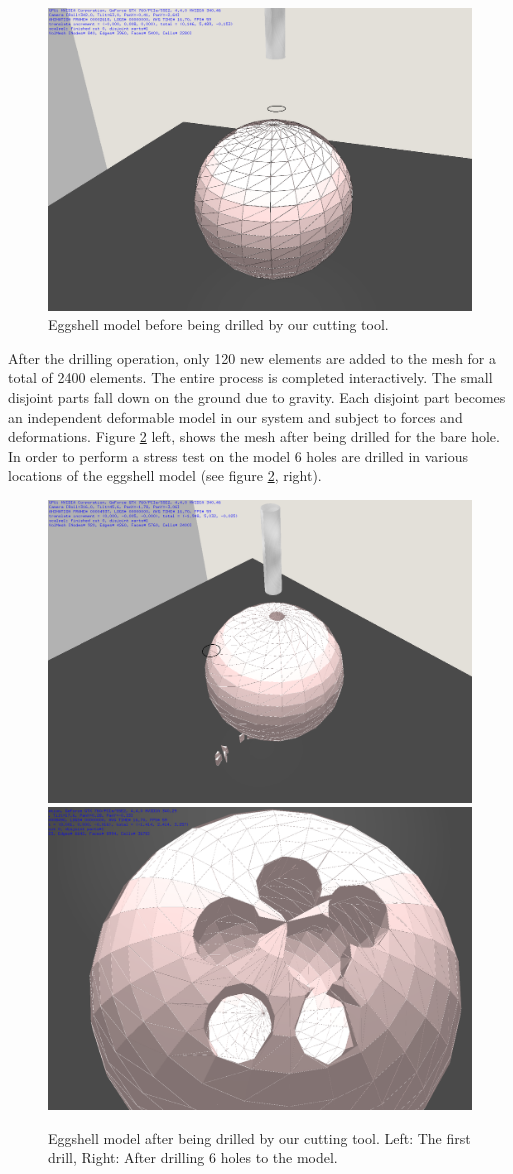 \begin{figure}[H]
  \centering
  \includegraphics[width=0.7\linewidth]{figures/evaluation/eggshell01.png}
  \caption{\label{fig:eggshell01}
  {Eggshell model before being drilled by our cutting tool.}
}
\end{figure}

After the drilling operation, only 120 new elements are added to the mesh for a total of 2400 elements. The entire process is completed 
interactively. The small disjoint parts fall down on the ground due to gravity. Each disjoint part becomes an independent
deformable model in our system and subject to forces and deformations. Figure \ref{fig:eggshell02} left, shows the mesh after being 
drilled for the bare hole. In order to perform a stress test on the model 6 
holes are drilled in various locations of the eggshell model (see figure \ref{fig:eggshell02}, right).


\begin{figure}[H]
  \centering
  \includegraphics[width=0.4\linewidth]{figures/evaluation/eggshell02.png}
  \includegraphics[width=0.4\linewidth]{figures/evaluation/eggshell05.png}
  \caption{\label{fig:eggshell02}
  {Eggshell model after being drilled by our cutting tool. Left: The first drill, Right: 
  After drilling 6 holes to the model.}
}
\end{figure}

